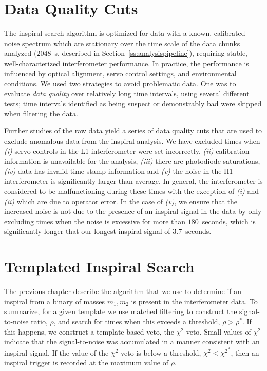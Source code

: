 \section{Data Quality Cuts}
\label{s:dq}

The inspiral search algorithm is optimized for data with a known,
calibrated noise spectrum which are stationary over the time scale of
the data chunks analyzed ($2048$~s, described in
Section~\ref{ss:analysispipeline}), requiring stable,
well-characterized interferometer performance.  In practice, the
performance is influenced by optical alignment, servo control
settings, and environmental conditions.  We used two strategies to
avoid problematic data.  One was to evaluate {\it data quality} over
relatively long time intervals, using several different tests; time
intervals identified as being suspect or demonstrably bad were skipped
when filtering the data.

Further studies of the raw data yield a series of data quality cuts
that are used to exclude anomalous data from the inspiral
analysis\cite{gwdawveto}. We have excluded times when \emph{(i)} servo
controls in the L1 interferometer were set incorrectly, \emph{(ii)}
calibration information is unavailable for the analysis, \emph{(iii)} there
are photodiode saturations, \emph{(iv)} data has invalid time stamp
information and \emph{(v)} the noise in the H1 interferometer is significantly
larger than average. In general, the interferometer is considered to be
malfunctioning during these times with the exception of \emph{(i)} and
\emph{(ii)} which are due to operator error. In the case of \emph{(v)}, we
ensure that the increased noise is not due to the presence of an inspiral
signal in the data by only excluding times when the noise is excessive for
more than $180$~seconds, which is significantly longer that our longest inspiral
signal of $3.7$~seconds.

\section{Templated Inspiral Search}
\label{s:pipetemplate}

The previous chapter describe the algorithm that we use to determine if an
inspiral from a binary of masses ${m_1,m_2}$ is present in the interferometer
data. To summarize, for a given template we use matched filtering to construct
the signal-to-noise ratio, $\rho$, and search for times when this exceeds a
threshold, $\rho > \rho^\ast$. If this happens, we construct a template based
veto, the $\chi^2$ veto\cite{brucechisq}. Small values of $\chi^2$ indicate
that the signal-to-noise was accumulated in a manner consistent with an
inspiral signal. If the value of the $\chi^2$ veto is below a threshold,
$\chi^2 < {\chi^2}^\ast$, then an inspiral trigger is recorded at the maximum
value of $\rho$.

